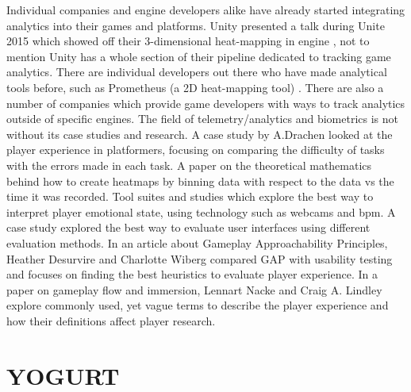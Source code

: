 \documentclass[journal]{IEEEtran}
\begin{document}
Individual companies and engine developers alike have already started integrating analytics into their games and platforms. Unity presented a talk during Unite 2015 which showed off their 3-dimensional heat-mapping in engine \cite{unite2015}, not to mention Unity has a whole section of their pipeline dedicated to tracking game analytics. There are individual developers out there who have made analytical tools before, such as Prometheus (a 2D heat-mapping tool) \cite{gibbs}. There are also a number of companies which provide game developers with ways to track analytics outside of specific engines. \cite{simpleusability} \cite{drachen} The field of telemetry/analytics and biometrics is not without its case studies and research. A case study by A.Drachen looked at the player experience in platformers, focusing on comparing the difficulty of tasks with the errors made in each task. \cite{wehbe} A paper on the theoretical mathematics behind how to create heatmaps by binning data with respect to the data vs the time it was recorded. \cite{kumatani} Tool suites and studies which explore the best way to interpret player emotional state, using technology such as webcams and bpm. \cite{dingli} A case study explored the best way to evaluate user interfaces using different evaluation methods. \cite{nielsen} In an article about Gameplay Approachability Principles, Heather Desurvire and Charlotte Wiberg compared GAP with usability testing and focuses on finding the best heuristics to evaluate player experience. \cite{desurvire} In a paper on gameplay flow and immersion, Lennart Nacke and Craig A. Lindley explore commonly used, yet vague terms to describe the player experience and how their definitions affect player research. \cite{nacke}


\section{YOGURT}

\end{document}

